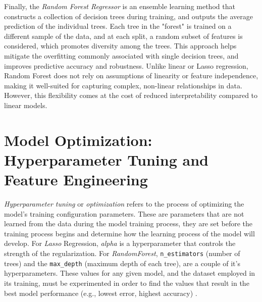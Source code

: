 \documentclass[12pt]{report} %
\begin{document}
Finally, the \textit{Random Forest Regressor} is an ensemble learning method that constructs a collection of decision trees during training, and outputs the average prediction of the individual trees. Each tree in the "forest" is trained on a different sample of the data, and at each split, a random subset of features is considered, which promotes diversity among the trees. This approach helps mitigate the overfitting commonly associated with single decision trees, and improves predictive accuracy and robustness. Unlike linear or Lasso regression, Random Forest does not rely on assumptions of linearity or feature independence, making it well-suited for capturing complex, non-linear relationships in data. However, this flexibility comes at the cost of reduced interpretability compared to linear models.




\section{Model Optimization: Hyperparameter Tuning and Feature Engineering}

\textit{Hyperparameter tuning} or \textit{optimization} refers to the process of optimizing the model's training configuration parameters. These are parameters that are not learned from the data during the model training process, they are set before the training process begins and determine how the learning process of the model will develop. For \textit{Lasso} Regression, \textit{alpha} is a hyperparameter that controls the strength of the regularization. For \textit{RandomForest}, \verb|n_estimators| (number of trees) and the \verb|max_depth| (maximum depth of each tree), are a couple of it's hyperparameters. These values for any given model, and the dataset employed in its training, must be experimented in order to find the values that result in the best model performance (e.g., lowest error, highest accuracy) \cite{AWSHyperparameterTuning}.
\end{document}
